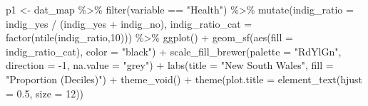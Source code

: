 \documentclass[
  letterpaper,
  DIV=11,
  numbers=noendperiod]{scrartcl}
\newenvironment{Shaded}{\begin{snugshade}}{\end{snugshade}}
\newcommand{\AttributeTok}[1]{\textcolor[rgb]{0.40,0.45,0.13}{#1}}
\newcommand{\DecValTok}[1]{\textcolor[rgb]{0.68,0.00,0.00}{#1}}
\newcommand{\FloatTok}[1]{\textcolor[rgb]{0.68,0.00,0.00}{#1}}
\newcommand{\FunctionTok}[1]{\textcolor[rgb]{0.28,0.35,0.67}{#1}}
\newcommand{\NormalTok}[1]{\textcolor[rgb]{0.00,0.23,0.31}{#1}}
\newcommand{\OtherTok}[1]{\textcolor[rgb]{0.00,0.23,0.31}{#1}}
\newcommand{\SpecialCharTok}[1]{\textcolor[rgb]{0.37,0.37,0.37}{#1}}
\newcommand{\StringTok}[1]{\textcolor[rgb]{0.13,0.47,0.30}{#1}}
\begin{document}
\begin{Shaded}
\begin{Highlighting}[]
\NormalTok{p1 }\OtherTok{\textless{}{-}}\NormalTok{ dat\_map }\SpecialCharTok{\%\textgreater{}\%}
  \FunctionTok{filter}\NormalTok{(variable }\SpecialCharTok{==} \StringTok{"Health"}\NormalTok{) }\SpecialCharTok{\%\textgreater{}\%}
  \FunctionTok{mutate}\NormalTok{(}\AttributeTok{indig\_ratio =}\NormalTok{ indig\_yes }\SpecialCharTok{/}\NormalTok{ (indig\_yes }\SpecialCharTok{+}\NormalTok{ indig\_no),}
         \AttributeTok{indig\_ratio\_cat =} \FunctionTok{factor}\NormalTok{(}\FunctionTok{ntile}\NormalTok{(indig\_ratio,}\DecValTok{10}\NormalTok{))) }\SpecialCharTok{\%\textgreater{}\%}
  \FunctionTok{ggplot}\NormalTok{() }\SpecialCharTok{+}
  \FunctionTok{geom\_sf}\NormalTok{(}\FunctionTok{aes}\NormalTok{(}\AttributeTok{fill =}\NormalTok{ indig\_ratio\_cat),}
          \AttributeTok{color =} \StringTok{"black"}\NormalTok{) }\SpecialCharTok{+}
  \FunctionTok{scale\_fill\_brewer}\NormalTok{(}\AttributeTok{palette =} \StringTok{"RdYlGn"}\NormalTok{,}
                    \AttributeTok{direction =} \SpecialCharTok{{-}}\DecValTok{1}\NormalTok{,}
                    \AttributeTok{na.value =} \StringTok{"grey"}\NormalTok{) }\SpecialCharTok{+} 
  \FunctionTok{labs}\NormalTok{(}\AttributeTok{title =} \StringTok{"New South Wales"}\NormalTok{,}
       \AttributeTok{fill =} \StringTok{"Proportion (Deciles)"}\NormalTok{) }\SpecialCharTok{+}
  \FunctionTok{theme\_void}\NormalTok{() }\SpecialCharTok{+}
  \FunctionTok{theme}\NormalTok{(}\AttributeTok{plot.title =} \FunctionTok{element\_text}\NormalTok{(}\AttributeTok{hjust =} \FloatTok{0.5}\NormalTok{,}
                                  \AttributeTok{size =} \DecValTok{12}\NormalTok{))}


\end{Highlighting}
\end{Shaded}
\end{document}
